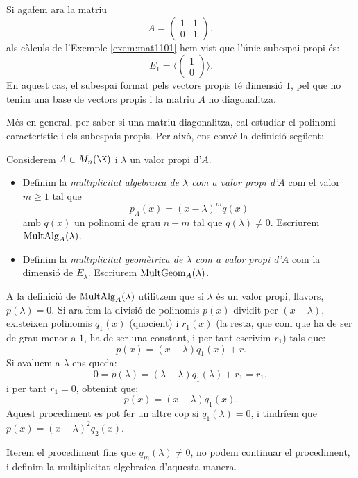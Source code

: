 \begin{exemple}
Si agafem ara la matriu
$$
A=\begin{pmatrix}1 & 1 \\ 0 & 1\end{pmatrix},
$$
als càlculs de l'Exemple \ref{exem:mat1101} hem vist que l'únic subespai propi és:
$$
E_1=\langle\begin{pmatrix}
1 \\ 0 
\end{pmatrix}\rangle.
$$
En aquest cas, el subespai format pels vectors propis té dimensió $1$, pel que no tenim una base de vectors propis i la matriu $A$ no diagonalitza.
\end{exemple}
Més en general, per saber si una matriu diagonalitza, cal estudiar el polinomi característic i els subespais propis. Per això, ens convé la definició següent:
\begin{definicio}
Considerem $A\in M_n(\K)$ i $\lambda$ un valor propi d'$A$.
\begin{itemize}
    \item Definim la \emph{multiplicitat algebraica de $\lambda$ com a valor propi d'$A$} com el valor $m\geq 1$ tal que
    $$
    p_A(x)=(x-\lambda)^m q(x)
    $$
    amb $q(x)$ un polinomi de grau $n-m$ tal que $q(\lambda)\neq 0$. Escriurem $\operatorname{MultAlg}_A(\lambda)$.
    \item Definim la \emph{multiplicitat geomètrica de $\lambda$ com a valor propi d'$A$} com la dimensió de $E_\lambda$. Escriurem $\operatorname{MultGeom}_A(\lambda)$.
\end{itemize}
\end{definicio}
\begin{observacio}
A la definició de $\operatorname{MultAlg}_A(\lambda)$ utilitzem que si $\lambda$ és un valor propi, llavors, $p(\lambda)=0$. Si ara fem la divisió de polinomis $p(x)$ dividit per $(x-\lambda)$, existeixen polinomis $q_1(x)$ (quocient) i $r_1(x)$ (la resta, que com que ha de ser de grau menor a $1$, ha de ser una constant, i per tant escrivim $r_1$) tals que:
$$p(x)=(x-\lambda)q_1(x)+r.$$
Si avaluem a $\lambda$ ens queda:
$$
0=p(\lambda)=(\lambda-\lambda)q_1(\lambda)+r_1=r_1 ,
$$
i per tant $r_1=0$, obtenint que:
$$
p(x)=(x-\lambda)q_1(x).
$$
Aquest procediment es pot fer un altre cop si $q_1(\lambda)=0$, i tindríem que $p(x)=(x-\lambda)^2q_2(x)$.

Iterem el procediment fins que $q_m(\lambda)\neq0$, no podem continuar el procediment, i definim la multiplicitat algebraica d'aquesta manera.
\end{observacio}
